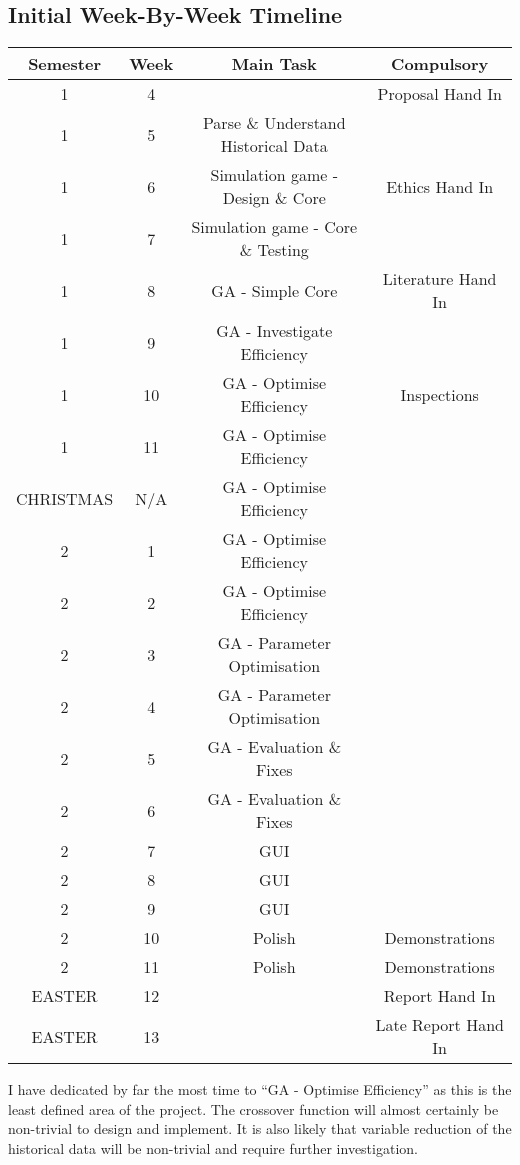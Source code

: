 \subsection{Initial Week-By-Week Timeline}
\begin{tabular}{|c|c|c|c|}
\hline
Semester & Week & Main Task & Compulsory \\
\hline
1 & 4 & & Proposal Hand In \\
1 & 5 & Parse \& Understand Historical Data & \\
1 & 6 & Simulation game - Design \& Core & Ethics Hand In \\
1 & 7 & Simulation game - Core \& Testing & \\
1 & 8 & GA - Simple Core & Literature Hand In \\
1 & 9 & GA - Investigate Efficiency & \\
1 & 10 & GA - Optimise Efficiency & Inspections \\
1 & 11 & GA - Optimise Efficiency & \\
CHRISTMAS & N/A & GA - Optimise Efficiency & \\
2 & 1 & GA - Optimise Efficiency & \\
2 & 2 & GA - Optimise Efficiency & \\
2 & 3 & GA - Parameter Optimisation & \\
2 & 4 & GA - Parameter Optimisation & \\
2 & 5 & GA - Evaluation \& Fixes & \\
2 & 6 & GA - Evaluation \& Fixes & \\
2 & 7 & GUI & \\
2 & 8 & GUI & \\
2 & 9 & GUI & \\
2 & 10 & Polish & Demonstrations \\
2 & 11 & Polish & Demonstrations \\
EASTER & 12 & & Report Hand In \\
EASTER & 13 & & Late Report Hand In \\
\hline
\end{tabular}
\newline \newline 
I have dedicated by far the most time to “GA - Optimise Efficiency” as this is the least defined area of the project. The crossover function will almost certainly be non-trivial to design and implement. It is also likely that variable reduction of the historical data will be non-trivial and require further investigation.